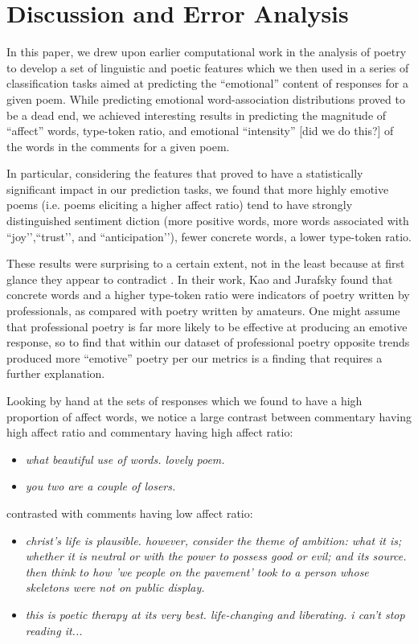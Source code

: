 \documentclass[11pt]{article}
\begin{document}
\section{Discussion and Error Analysis}
In this paper, we drew upon earlier computational work in the analysis of poetry to develop a set of linguistic and poetic features which we then used in a series of classification tasks aimed at predicting the ``emotional'' content of responses for a given poem. While predicting emotional word-association distributions proved to be a dead end, we achieved interesting results in predicting the magnitude of ``affect'' words, type-token ratio, and emotional ``intensity'' [did we do this?] of the words in the comments for a given poem.

In particular, considering the features that proved to have a statistically significant impact in our prediction tasks, we found that more highly emotive poems (i.e. poems eliciting a higher affect ratio) tend to have strongly distinguished sentiment diction (more positive words, more words associated with ``joy’’,``trust’’, and ``anticipation’’), fewer concrete words, a lower type-token ratio.

These results were surprising to a certain extent, not in the least because at first glance they appear to contradict . In their work, Kao and Jurafsky found that concrete words and a higher type-token ratio were indicators of poetry written by professionals, as compared with poetry written by amateurs. One might assume that professional poetry is far more likely to be effective at producing an emotive response, so to find that within our dataset of professional poetry opposite trends produced more ``emotive'' poetry per our metrics is a finding that requires a further explanation.

Looking by hand at the sets of responses which we found to have a high proportion of affect words, we notice a large contrast between commentary having high affect ratio and commentary having high affect ratio:

\begin{itemize}
\item \emph{what beautiful use of words. lovely poem.}
\item \emph{you two are a couple of losers.}
\end{itemize}

contrasted with comments having low affect ratio:

\begin{itemize}
\item \emph{christ's life is plausible. however, consider the theme of ambition: what it is; whether it is neutral or with the power to possess good or evil; and its source. then think to how 'we people on the pavement' took to a person whose skeletons were not on public display.}
\item \emph{this is poetic therapy at its very best. life-changing and liberating. i can't stop reading it...}
\end{itemize}
\end{document}
